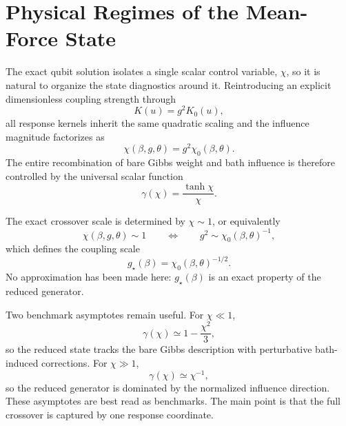 \section{Physical Regimes of the Mean-Force State}
\label{sec:response_scale}\label{sec:numerical_v6}

The exact qubit solution isolates a single scalar control variable,
\(\chi\), so it is natural to organize the state diagnostics around it.
Reintroducing an explicit dimensionless coupling strength through
\begin{equation}
    K(u)=g^2 K_0(u),
\end{equation}
all response kernels inherit the same quadratic scaling and the influence
magnitude factorizes as
\begin{equation}
    \chi(\beta,g,\theta)=g^2\chi_0(\beta,\theta).
\end{equation}
The entire recombination of bare Gibbs weight and bath influence is therefore
controlled by the universal scalar function
\begin{equation}
    \gamma(\chi)=\frac{\tanh\chi}{\chi}.
    \label{eq:gamma_chi_crossover_v5}
\end{equation}

The exact crossover scale is determined by \(\chi\sim 1\), or equivalently
\begin{equation}
    \chi(\beta,g,\theta)\sim 1
    \qquad \Longleftrightarrow \qquad
    g^2 \sim \chi_0(\beta,\theta)^{-1},
    \label{eq:chi_crossover_condition_v5}
\end{equation}
which defines the coupling scale
\begin{equation}
    g_\star(\beta)=\chi_0(\beta,\theta)^{-1/2}.
    \label{eq:gstar_def_v6}
\end{equation}
No approximation has been made here: \(g_\star(\beta)\) is an exact property of
the reduced generator.

Two benchmark asymptotes remain useful. For \(\chi\ll 1\),
\begin{equation}
    \gamma(\chi)\simeq 1-\frac{\chi^2}{3},
    \label{eq:gamma_weak}
\end{equation}
so the reduced state tracks the bare Gibbs description with perturbative
bath-induced corrections. For \(\chi\gg 1\),
\begin{equation}
    \gamma(\chi)\simeq \chi^{-1},
    \label{eq:gamma_strong}
\end{equation}
so the reduced generator is dominated by the normalized influence direction.
These asymptotes are best read as benchmarks. The main point is that the full
crossover is captured by one response coordinate.


